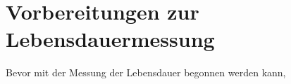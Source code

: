 \section{Vorbereitungen zur Lebensdauermessung}
\label{sec:vorbereitungen}
Bevor mit der Messung der Lebensdauer begonnen werden kann,

